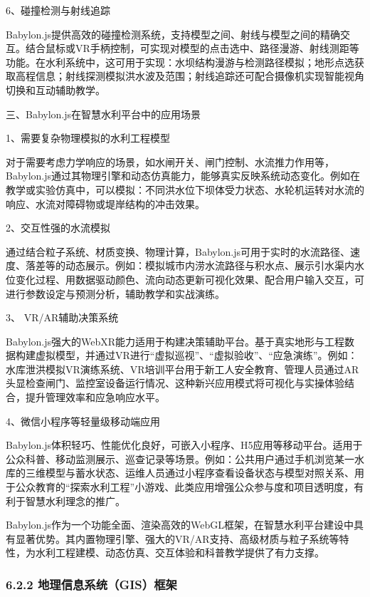 6、碰撞检测与射线追踪

Babylon.js提供高效的碰撞检测系统，支持模型之间、射线与模型之间的精确交互。结合鼠标或VR手柄控制，可实现对模型的点击选中、路径漫游、射线测距等功能。在水利系统中，这可用于实现：水坝结构漫游与检测路径模拟；地形点选获取高程信息；射线探测模拟洪水波及范围；射线追踪还可配合摄像机实现智能视角切换和互动辅助教学。

三、Babylon.js在智慧水利平台中的应用场景

1、需要复杂物理模拟的水利工程模型

对于需要考虑力学响应的场景，如水闸开关、闸门控制、水流推力作用等，Babylon.js通过其物理引擎和动态仿真能力，能够真实反映系统动态变化。例如在教学或实验仿真中，可以模拟：不同洪水位下坝体受力状态、水轮机运转对水流的响应、水流对障碍物或堤岸结构的冲击效果。

2、交互性强的水流模拟

通过结合粒子系统、材质变换、物理计算，Babylon.js可用于实时的水流路径、速度、落差等的动态展示。例如：模拟城市内涝水流路径与积水点、展示引水渠内水位变化过程、用数据驱动颜色、流向动态更新可视化效果、配合用户输入交互，可进行参数设定与预测分析，辅助教学和实战演练。

3、 VR/AR辅助决策系统

Babylon.js强大的WebXR能力适用于构建决策辅助平台。基于真实地形与工程数据构建虚拟模型，并通过VR进行``虚拟巡视''、``虚拟验收''、``应急演练''。例如：水库泄洪模拟VR演练系统、VR培训平台用于新工人安全教育、管理人员通过AR头显检查闸门、监控室设备运行情况、这种新兴应用模式将可视化与实操体验结合，提升管理效率和应急响应水平。

4、微信小程序等轻量级移动端应用

Babylon.js体积轻巧、性能优化良好，可嵌入小程序、H5应用等移动平台。适用于公众科普、移动监测展示、巡查记录等场景。例如：公共用户通过手机浏览某一水库的三维模型与蓄水状态、运维人员通过小程序查看设备状态与模型对照关系、用于公众教育的``探索水利工程''小游戏、此类应用增强公众参与度和项目透明度，有利于智慧水利理念的推广。

Babylon.js作为一个功能全面、渲染高效的WebGL框架，在智慧水利平台建设中具有显著优势。其内置物理引擎、强大的VR/AR支持、高级材质与粒子系统等特性，为水利工程建模、动态仿真、交互体验和科普教学提供了有力支撑。

\hypertarget{ux5730ux7406ux4fe1ux606fux7cfbux7edfgisux6846ux67b6}{%
\subsubsection{6.2.2 地理信息系统（GIS）框架}\label{ux5730ux7406ux4fe1ux606fux7cfbux7edfgisux6846ux67b6}}


